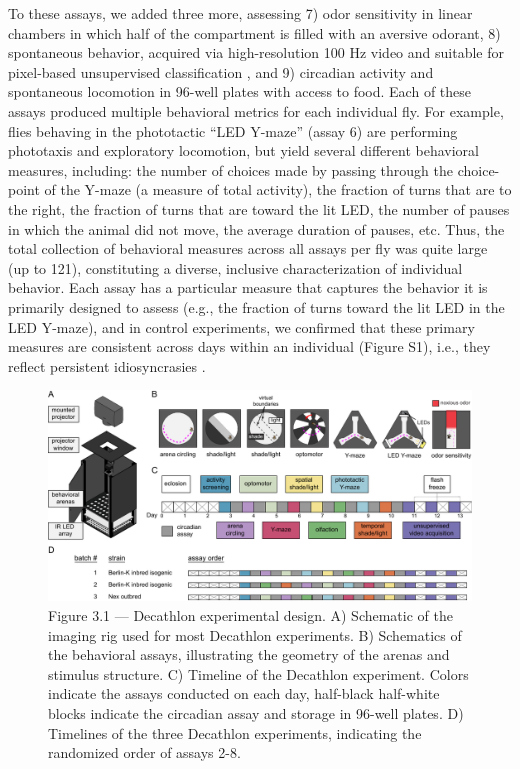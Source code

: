 \documentclass[12pt,letterpaper]{article}
\begin{document}
To these assays, we added three more, assessing 7) odor sensitivity in linear chambers \cite{Claridge-Chang_Writing_2009} in which half of the compartment is filled with an aversive odorant, 8) spontaneous behavior, acquired via high-resolution 100 Hz video and suitable for pixel-based unsupervised classification \cite{berman_choi_bialek_shaevitz_2014}, and 9) circadian activity and spontaneous locomotion in 96-well plates with access to food. Each of these assays produced multiple behavioral metrics for each individual fly. For example, flies behaving in the phototactic “LED Y-maze” (assay 6) are performing phototaxis and exploratory locomotion, but yield several different behavioral measures, including: the number of choices made by passing through the choice-point of the Y-maze (a measure of total activity), the fraction of turns that are to the right, the fraction of turns that are toward the lit LED, the number of pauses in which the animal did not move, the average duration of pauses, etc. Thus, the total collection of behavioral measures across all assays per fly was quite large (up to 121), constituting a diverse, inclusive characterization of individual behavior. Each assay has a particular measure that captures the behavior it is primarily designed to assess (e.g., the fraction of turns toward the lit LED in the LED Y-maze), and in control experiments, we confirmed that these primary measures are consistent across days within an individual (Figure S1), i.e., they reflect persistent idiosyncrasies \cite{Kain_Phototactic_2012,Buchanan_Neuronal_2015,Kain_Variability_2015}.

\begin{figure}[t!]
    \includegraphics[width=\textwidth]{../figures/chapter_3/fig_3-1.pdf}
    \vspace{.1in}
    \caption*{Figure 3.1 — Decathlon experimental design. A) Schematic of the imaging rig used for most Decathlon experiments. B) Schematics of the behavioral assays, illustrating the geometry of the arenas and stimulus structure. C) Timeline of the Decathlon experiment. Colors indicate the assays conducted on each day, half-black half-white blocks indicate the circadian assay and storage in 96-well plates. D) Timelines of the three Decathlon experiments, indicating the randomized order of assays 2-8.}
\end{figure}
\end{document}
